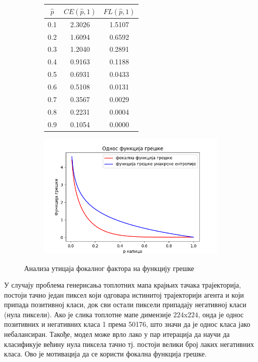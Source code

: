 \documentclass[11pt,oneside]{memoir}
\begin{document}
\begin{figure}[H]
  \centering
  \begin{subfigure}{5cm}
    \begin{table}[H]
      \begin{tabular}{c|c|c}
        $\hat{p}$ & $CE(\hat{p}, 1)$ & $FL(\hat{p}, 1)$ \\
        \hline
        0.1 & 2.3026 & 1.5107 \\
        0.2 & 1.6094 & 0.6592 \\
        0.3 & 1.2040 & 0.2891 \\
        0.4 & 0.9163 & 0.1188 \\
        0.5 & 0.6931 & 0.0433 \\
        0.6 & 0.5108 & 0.0131 \\
        0.7 & 0.3567 & 0.0029 \\
        0.8 & 0.2231 & 0.0004 \\
        0.9 & 0.1054 & 0.0000    
      \end{tabular}
    \end{table}
  \end{subfigure}
  \begin{subfigure}{7cm}
    \includegraphics[width=1.0\textwidth]{images/fl_vs_ce.png}
  \end{subfigure}
  \caption{Анализа утицаја фокалног фактора на функцију грешке \label{fl-table}}
\end{figure}

У случају проблема генерисања топлотних мапа крајњих тачака трајекторија, постоји тачно један пиксел који одговара истинитој трајекторији
агента и који припада позитивној класи, док сви остали пиксели припадају негативној класи (нула пиксели). Ако је слика топлотне мапе димензије 
$224$x$224$, онда је однос позитивних и негативних класа
1 према 50176, што значи да је однос класа јако небалансиран. Такође, модел може врло лако у пар итерација да научи
да класификује већину нула пиксела тачно тј. постоји велики број лаких негативних класа. Ово је мотивација да се користи фокална функција грешке.
\end{document}
